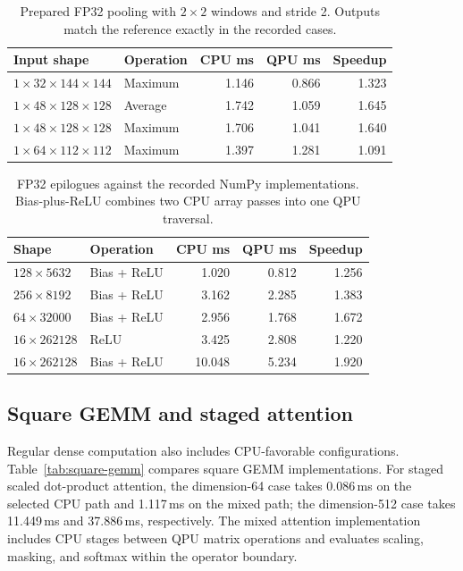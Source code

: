 \documentclass[sigplan,screen,review]{acmart}
\begin{document}
\begin{table}[t]
\centering
\caption{Prepared FP32 pooling with $2\times2$ windows and stride 2. Outputs match the reference exactly in the recorded cases.}
\label{tab:pooling}
\small
\begin{tabular}{@{}llrrr@{}}
\toprule
Input shape & Operation & CPU ms & QPU ms & Speedup \\
\midrule
$1\times32\times144\times144$ & Maximum & 1.146 & 0.866 & 1.323 \\
$1\times48\times128\times128$ & Average & 1.742 & 1.059 & 1.645 \\
$1\times48\times128\times128$ & Maximum & 1.706 & 1.041 & 1.640 \\
$1\times64\times112\times112$ & Maximum & 1.397 & 1.281 & 1.091 \\
\bottomrule
\end{tabular}
\end{table}

\begin{table}[t]
\centering
\caption{FP32 epilogues against the recorded NumPy implementations. Bias-plus-ReLU combines two CPU array passes into one QPU traversal.}
\label{tab:epilogues}
\small
\begin{tabular}{@{}llrrr@{}}
\toprule
Shape & Operation & CPU ms & QPU ms & Speedup \\
\midrule
$128\times5632$ & Bias + ReLU & 1.020 & 0.812 & 1.256 \\
$256\times8192$ & Bias + ReLU & 3.162 & 2.285 & 1.383 \\
$64\times32000$ & Bias + ReLU & 2.956 & 1.768 & 1.672 \\
$16\times262128$ & ReLU & 3.425 & 2.808 & 1.220 \\
$16\times262128$ & Bias + ReLU & 10.048 & 5.234 & 1.920 \\
\bottomrule
\end{tabular}
\end{table}

\subsection{Square GEMM and staged attention}

Regular dense computation also includes CPU-favorable configurations. Table~\ref{tab:square-gemm} compares square GEMM implementations. For staged scaled dot-product attention, the dimension-64 case takes 0.086\,ms on the selected CPU path and 1.117\,ms on the mixed path; the dimension-512 case takes 11.449\,ms and 37.886\,ms, respectively. The mixed attention implementation includes CPU stages between QPU matrix operations and evaluates scaling, masking, and softmax within the operator boundary.
\end{document}
